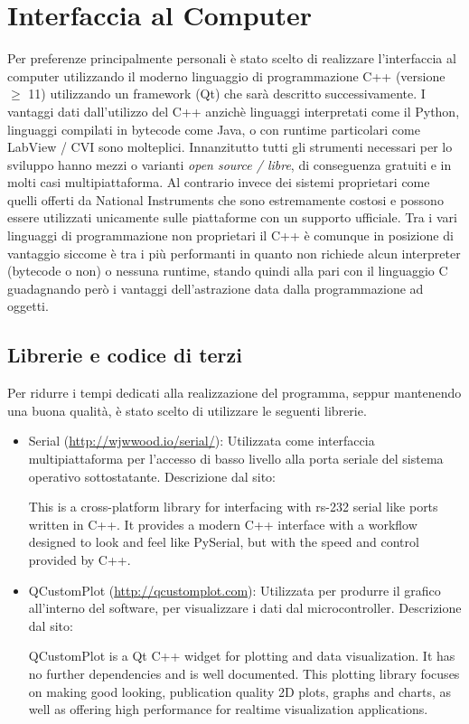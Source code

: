 \section{Interfaccia al Computer}
Per preferenze principalmente personali \`e stato scelto di realizzare
l'interfaccia al computer utilizzando il moderno linguaggio di programmazione
C++ (versione \(\geq\) 11) utilizzando un framework (Qt) che sar\`a descritto
successivamente.  I vantaggi dati dall'utilizzo del C++ anzich\`e linguaggi
interpretati come il Python, linguaggi compilati in bytecode come Java, o con
runtime particolari come LabView / CVI sono molteplici. Innanzitutto tutti gli
strumenti necessari per lo sviluppo hanno mezzi o varianti \emph{open source /
libre}, di conseguenza gratuiti e in molti casi multipiattaforma. Al contrario
invece dei sistemi proprietari come quelli offerti da National Instruments che
sono estremamente costosi e possono essere utilizzati unicamente sulle
piattaforme con un supporto ufficiale.  Tra i vari linguaggi di programmazione
non proprietari il C++ \`e comunque in posizione di vantaggio siccome \`e tra
i pi\`u performanti in quanto non richiede alcun interpreter (bytecode o non)
o nessuna runtime, stando quindi alla pari con il linguaggio C guadagnando
per\`o i vantaggi dell'astrazione data dalla programmazione ad oggetti.

\subsection{Librerie e codice di terzi}
Per ridurre i tempi dedicati alla realizzazione del programma, seppur
mantenendo una buona qualit\`a, \`e stato scelto di utilizzare le seguenti
librerie.

\begin{itemize}
    \item Serial (\url{http://wjwwood.io/serial/}): Utilizzata come
        interfaccia multipiattaforma per l'accesso di basso livello alla porta
        seriale del sistema operativo sottostatante. Descrizione dal sito:
        \begin{displayquote}
            This is a cross-platform library for interfacing with rs-232
            serial like ports written in C++. It provides a modern C++
            interface with a workflow designed to look and feel like PySerial,
            but with the speed and control provided by C++. 
        \end{displayquote}

    \item QCustomPlot (\url{http://qcustomplot.com}): Utilizzata per produrre
        il grafico all'interno del software, per visualizzare i dati dal
        microcontroller. Descrizione dal sito:
        \begin{displayquote}
            QCustomPlot is a Qt C++ widget for plotting and data
            visualization. It has no further dependencies and is well
            documented. This plotting library focuses on making good looking,
            publication quality 2D plots, graphs and charts, as well as
            offering high performance for realtime visualization applications. 
        \end{displayquote}
\end{itemize}

